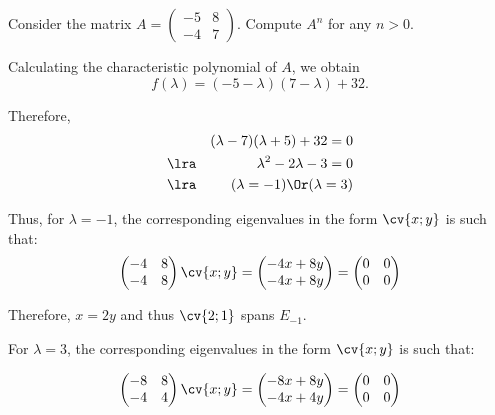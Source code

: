 \documentclass[11pt]{scrartcl}
\begin{document}
\begin{linenumbers}

  \begin{problem*}
    Consider the matrix $A =
    \begin{pmatrix}
      -5 & 8 \\
      -4 & 7
    \end{pmatrix}$. Compute $A^n$ for any $n > 0$.
  \end{problem*}
  \begin{soln}
    Calculating the characteristic polynomial of $A$, we obtain
    \[f(\lambda) = (-5-\lambda)(7-\lambda) + 32.\]

    Therefore,
    \begin{align}
      & & (\lambda - 7)(\lambda + 5) + 32 = 0 \\
      \lra & &  \lambda^2-2\lambda - 3 =0          \\
      \lra & & ( \lambda = -1) \Or (\lambda = 3)
    \end{align}

    Thus, for $\lambda = -1$, the corresponding eigenvalues in the
    form $\cv{x;y}$ is such that:
    \begin{equation*}
      \begin{pmatrix}
        -4 & 8\\
        -4 & 8
      \end{pmatrix} \cv{x;y} =
      \begin{pmatrix}
        -4x + 8y\\
        -4x + 8y
      \end{pmatrix}=
      \begin{pmatrix}
        0 & 0\\
        0 & 0
      \end{pmatrix}
    \end{equation*}

    Therefore, $x = 2y$ and thus $\cv{2; 1}$ spans $E_{-1}$.

    For $\lambda = 3$, the corresponding eigenvalues in the
    form $\cv{x;y}$ is such that:


    \begin{equation*}
      \begin{pmatrix}
        -8 & 8\\
        -4 & 4
      \end{pmatrix} \cv{x;y} =
      \begin{pmatrix}
        -8x + 8y\\
        -4x + 4y
      \end{pmatrix}=
      \begin{pmatrix}
        0 & 0\\
        0 & 0
      \end{pmatrix}
    \end{equation*}


\end{soln}
\end{linenumbers}
\end{document}
